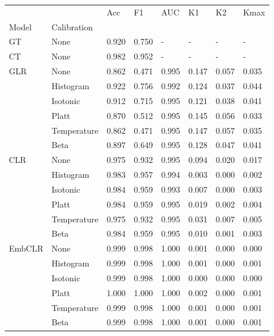 \begin{tabular}{llllllll}
\toprule
 &  & Acc & F1 & AUC & K1 & K2 & Kmax \\
Model & Calibration &  &  &  &  &  &  \\
\midrule
GT & None & 0.920 & 0.750 & - & - & - & - \\
\cline{1-8}
CT & None & 0.982 & 0.952 & - & - & - & - \\
\cline{1-8}
\multirow[t]{6}{*}{GLR} & None & 0.862 & 0.471 & 0.995 & 0.147 & 0.057 & 0.035 \\
 & Histogram & 0.922 & 0.756 & 0.992 & 0.124 & 0.037 & 0.044 \\
 & Isotonic & 0.912 & 0.715 & 0.995 & 0.121 & 0.038 & 0.041 \\
 & Platt & 0.870 & 0.512 & 0.995 & 0.145 & 0.056 & 0.033 \\
 & Temperature & 0.862 & 0.471 & 0.995 & 0.147 & 0.057 & 0.035 \\
 & Beta & 0.897 & 0.649 & 0.995 & 0.128 & 0.047 & 0.041 \\
\cline{1-8}
\multirow[t]{6}{*}{CLR} & None & 0.975 & 0.932 & 0.995 & 0.094 & 0.020 & 0.017 \\
 & Histogram & 0.983 & 0.957 & 0.994 & 0.003 & 0.000 & 0.002 \\
 & Isotonic & 0.984 & 0.959 & 0.993 & 0.007 & 0.000 & 0.003 \\
 & Platt & 0.984 & 0.959 & 0.995 & 0.019 & 0.002 & 0.004 \\
 & Temperature & 0.975 & 0.932 & 0.995 & 0.031 & 0.007 & 0.005 \\
 & Beta & 0.984 & 0.959 & 0.995 & 0.010 & 0.001 & 0.003 \\
\cline{1-8}
\multirow[t]{6}{*}{EmbCLR} & None & 0.999 & 0.998 & 1.000 & 0.001 & 0.000 & 0.000 \\
 & Histogram & 0.999 & 0.998 & 1.000 & 0.001 & 0.000 & 0.001 \\
 & Isotonic & 0.999 & 0.998 & 1.000 & 0.000 & 0.000 & 0.000 \\
 & Platt & 1.000 & 1.000 & 1.000 & 0.002 & 0.000 & 0.001 \\
 & Temperature & 0.999 & 0.998 & 1.000 & 0.001 & 0.000 & 0.001 \\
 & Beta & 0.999 & 0.998 & 1.000 & 0.001 & 0.000 & 0.001 \\
\cline{1-8}
\bottomrule
\end{tabular}
